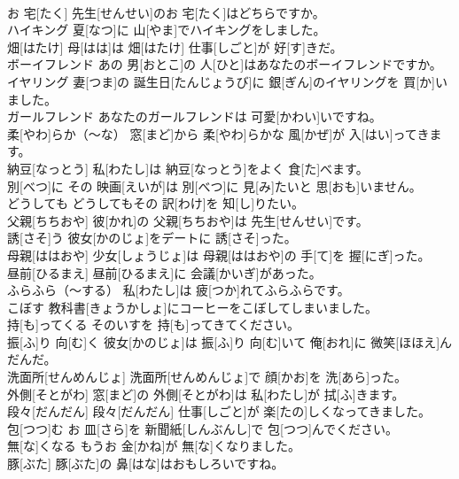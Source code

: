 \documentclass[8pt]{extreport}
\begin{document}
\begin{CJK}{UTF8}{min}
\\	お 宅[たく]	先生[せんせい]のお 宅[たく]はどちらですか。		
\\	ハイキング	夏[なつ]に 山[やま]でハイキングをしました。		
\\	畑[はたけ]	母[はは]は 畑[はたけ] 仕事[しごと]が 好[す]きだ。		
\\	ボーイフレンド	あの 男[おとこ]の 人[ひと]はあなたのボーイフレンドですか。		
\\	イヤリング	妻[つま]の 誕生日[たんじょうび]に 銀[ぎん]のイヤリングを 買[か]いました。		
\\	ガールフレンド	あなたのガールフレンドは 可愛[かわい]いですね。		
\\	柔[やわ]らか（～な）	窓[まど]から 柔[やわ]らかな 風[かぜ]が 入[はい]ってきます。		
\\	納豆[なっとう]	私[わたし]は 納豆[なっとう]をよく 食[た]べます。		
\\	別[べつ]に	その 映画[えいが]は 別[べつ]に 見[み]たいと 思[おも]いません。		
\\	どうしても	どうしてもその 訳[わけ]を 知[し]りたい。		
\\	父親[ちちおや]	彼[かれ]の 父親[ちちおや]は 先生[せんせい]です。		
\\	誘[さそ]う	彼女[かのじょ]をデートに 誘[さそ]った。		
\\	母親[ははおや]	少女[しょうじょ]は 母親[ははおや]の 手[て]を 握[にぎ]った。		
\\	昼前[ひるまえ]	昼前[ひるまえ]に 会議[かいぎ]があった。		
\\	ふらふら（～する）	私[わたし]は 疲[つか]れてふらふらです。		
\\	こぼす	教科書[きょうかしょ]にコーヒーをこぼしてしまいました。		
\\	持[も]ってくる	そのいすを 持[も]ってきてください。		
\\	振[ふ]り 向[む]く	彼女[かのじょ]は 振[ふ]り 向[む]いて 俺[おれ]に 微笑[ほほえ]んだんだ。		
\\	洗面所[せんめんじょ]	洗面所[せんめんじょ]で 顔[かお]を 洗[あら]った。		
\\	外側[そとがわ]	窓[まど]の 外側[そとがわ]は 私[わたし]が 拭[ふ]きます。		
\\	段々[だんだん]	段々[だんだん] 仕事[しごと]が 楽[たの]しくなってきました。		
\\	包[つつ]む	お 皿[さら]を 新聞紙[しんぶんし]で 包[つつ]んでください。		
\\	無[な]くなる	もうお 金[かね]が 無[な]くなりました。		
\\	豚[ぶた]	豚[ぶた]の 鼻[はな]はおもしろいですね。		

\end{CJK}
\end{document}

